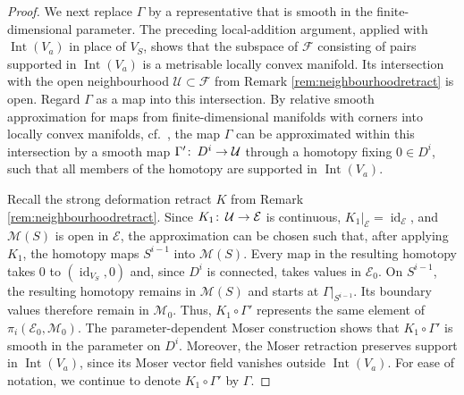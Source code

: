 \documentclass{amsart}
\theoremstyle{definition}
\def\co{\colon\thinspace}
\newcommand{\EE}{\mathcal E}
\newcommand{\FF}{\mathcal F}
\newcommand{\MM}{\mathcal M}
\newcommand{\UU}{\mathcal U}
\newcommand{\ra}{\rightarrow}
\DeclareMathOperator{\id}{\mathrm{id}}
\DeclareMathOperator{\Int}{\mathrm{Int}}
\begin{document}
\begin{proof}
We next replace $\Gamma$ by a representative
that is smooth in the finite-dimensional parameter.
The preceding local-addition argument,
applied with $\Int(V_a)$ in place of $V_S$,
shows that the subspace of $\FF$
consisting of pairs supported in $\Int(V_a)$
is a metrisable locally convex manifold.
Its intersection with the open neighbourhood
$\UU\subset\FF$
from Remark \ref{rem:neighbourhoodretract}
is open.
Regard $\Gamma$ as a map into this intersection.
By relative smooth approximation for maps
from finite-dimensional manifolds with corners
into locally convex manifolds,
cf.\ \cite[Theorem~11 and Proposition~13]{woc09},
the map $\Gamma$ can be approximated
within this intersection
by a smooth map $\Gamma'\co D^i\ra\UU$
through a homotopy fixing $0\in D^i$,
such that all members of the homotopy
are supported in $\Int(V_a)$.

Recall the strong deformation retract $K$ from
Remark \ref{rem:neighbourhoodretract}.
Since $K_1\co\UU\ra\EE$ is continuous,
$K_1|_{\EE}=\id_{\EE}$,
and $\MM(S)$ is open in $\EE$,
the approximation can be chosen such that,
after applying $K_1$,
the homotopy maps $S^{i-1}$ into $\MM(S)$.
Every map in the resulting homotopy
takes $0$ to $(\id_{V_S},0)$
and, since $D^i$ is connected,
takes values in $\EE_0$.
On $S^{i-1}$,
the resulting homotopy remains in $\MM(S)$
and starts at $\Gamma|_{S^{i-1}}$.
Its boundary values therefore remain in $\MM_0$.
Thus,
$K_1\circ\Gamma'$
represents the same element of
$\pi_i(\EE_0,\MM_0)$.
The parameter-dependent Moser construction
shows that $K_1\circ\Gamma'$ is smooth
in the parameter on $D^i$.
Moreover, the Moser retraction preserves support
in $\Int(V_a)$,
since its Moser vector field vanishes
outside $\Int(V_a)$.
For ease of notation,
we continue to denote $K_1\circ\Gamma'$ by $\Gamma$.


\end{proof}
\end{document}
